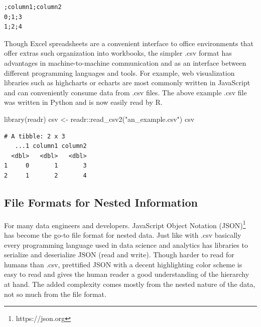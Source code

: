 \documentclass[
  12pt,
  letterpaper,
]{krantz}
\newenvironment{Shaded}{\begin{snugshade}}{\end{snugshade}}
\newcommand{\FunctionTok}[1]{\textcolor[rgb]{0.28,0.35,0.67}{#1}}
\newcommand{\NormalTok}[1]{\textcolor[rgb]{0.00,0.23,0.31}{#1}}
\newcommand{\OtherTok}[1]{\textcolor[rgb]{0.00,0.23,0.31}{#1}}
\newcommand{\SpecialCharTok}[1]{\textcolor[rgb]{0.37,0.37,0.37}{#1}}
\newcommand{\StringTok}[1]{\textcolor[rgb]{0.13,0.47,0.30}{#1}}
\begin{document}
\begin{verbatim}
;column1;column2
0;1;3
1;2;4
\end{verbatim}

Though Excel spreadsheets are a convenient interface to office
environments that offer extras such organization into workbooks, the
simpler .csv format has advantages in machine-to-machine communication
and as an interface between different programming languages and tools.
For example, web visualization libraries such as highcharts or echarts
are most commonly written in JavaScript and can
conveniently consume data from .csv files. The above example .csv file
was written in Python and is now easily read by R.

\normalsize

\begin{Shaded}
\begin{Highlighting}[]
\FunctionTok{library}\NormalTok{(readr)}
\NormalTok{csv }\OtherTok{\textless{}{-}}\NormalTok{ readr}\SpecialCharTok{::}\FunctionTok{read\_csv2}\NormalTok{(}\StringTok{"an\_example.csv"}\NormalTok{)}
\NormalTok{csv}
\end{Highlighting}
\end{Shaded}

\begin{verbatim}
# A tibble: 2 x 3
   ...1 column1 column2
  <dbl>   <dbl>   <dbl>
1     0       1       3
2     1       2       4
\end{verbatim}

\normalsize

\hypertarget{file-formats-for-nested-information}{%
\subsection{File Formats for Nested
Information}\label{file-formats-for-nested-information}}

For many data engineers and developers. JavaScript Object Notation
(JSON)\footnote{https://json.org} has become the go-to file
format for nested data. Just like with .csv basically every programming
language used in data science and analytics has libraries to serialize
and deserialize JSON (read and write). Though harder to read for humans
than .csv, prettified JSON with a decent highlighting color scheme is
easy to read and gives the human reader a good understanding of the
hierarchy at hand. The added complexity comes mostly from the nested
nature of the data, not so much from the file format.
\end{document}
